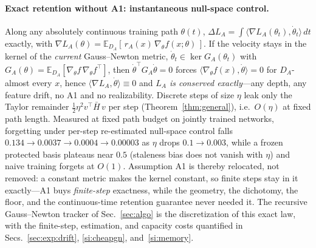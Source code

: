 \documentclass[10pt,a4paper]{article}
\theoremstyle{plain}
\theoremstyle{definition}
\begin{document}
\paragraph{Exact retention without A1: instantaneous null-space control.} Along any
absolutely continuous training path $\theta(t)$,
$\Delta L_A=\int\langle\nabla L_A(\theta_t),\dot\theta_t\rangle\,dt$ exactly, with
$\nabla L_A(\theta)=\mathbb{E}_{D_A}[\,r_A(x)\,\nabla_\theta f(x;\theta)\,]$. If the
velocity stays in the kernel of the \emph{current} Gauss--Newton metric,
$\dot\theta_t\in\ker G_A(\theta_t)$ with
$G_A(\theta)=\mathbb{E}_{D_A}[\nabla_\theta f\,\nabla_\theta f^\top]$, then
$\dot\theta^\top G_A\dot\theta=0$ forces
$\langle\nabla_\theta f(x),\dot\theta\rangle=0$ for $D_A$-almost every $x$, hence
$\langle\nabla L_A,\dot\theta\rangle\equiv0$ and \emph{$L_A$ is conserved exactly}---any
depth, any feature drift, no A1 and no realizability. Discrete steps of size $\eta$ leak
only the Taylor remainder $\tfrac12\eta^2 v^\top\bar H\,v$ per step
(Theorem~\ref{thm:general}), i.e.\ $O(\eta)$ at fixed path length. Measured at fixed path
budget on jointly trained networks, forgetting under per-step re-estimated null-space
control falls $0.134\to0.0037\to0.0004\to0.00003$ as $\eta$ drops $0.1\to0.003$, while a
frozen protected basis plateaus near $0.5$ (staleness bias does not vanish with $\eta$)
and naive training forgets at $O(1)$. Assumption A1 is thereby relocated, not removed: a
constant metric makes the kernel constant, so finite steps stay in it exactly---A1 buys
\emph{finite-step} exactness, while the geometry, the dichotomy, the floor, and the
continuous-time retention guarantee never needed it. The recursive Gauss--Newton tracker
of Sec.~\ref{sec:algo} is the discretization of this exact law, with the finite-step,
estimation, and capacity costs quantified in Secs.~\ref{sec:exp:drift},
\ref{si:cheapgn}, and~\ref{si:memory}.
\end{document}
